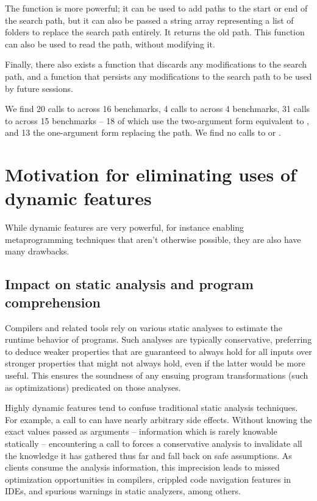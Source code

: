 The  function is more powerful; it can be used to add paths to the
start or end of the search path, but it can also be passed a string array
representing a list of folders to replace the search path entirely. It returns
the old path. This function can also be used to read the path, without
modifying it.

Finally, there also exists a  function that discards
any modifications to the search path, and a  function that
persists any modifications to the search path to be used by future \matlab
sessions.

We find 20 calls to  across 16 benchmarks, 4 calls to
 across 4 benchmarks, 31 calls to  across 15 benchmarks
-- 18 of which use the two-argument form equivalent to , and 13
the one-argument form replacing the path. We find no calls to
 or .

\section{Motivation for eliminating uses of dynamic features}

While dynamic features are very powerful, for instance enabling metaprogramming
techniques that aren't otherwise possible, they are also have many drawbacks.

\subsection{Impact on static analysis and program comprehension}

Compilers and related tools rely on various static analyses to estimate the
runtime behavior of programs. Such analyses are typically conservative,
preferring to deduce weaker properties that are guaranteed to always hold for
all inputs over stronger properties that might not always hold, even if the
latter would be more useful. This ensures the soundness of any ensuing program
transformations (such as optimizations) predicated on those analyses.

Highly dynamic features tend to confuse traditional static analysis techniques.
For example, a call to  can have nearly arbitrary side effects.
Without knowing the exact values passed as arguments -- information which is
rarely knowable statically -- encountering a call to  forces a
conservative analysis to invalidate all the knowledge it has gathered thus far
and fall back on safe assumptions. As clients consume the analysis information,
this imprecision leads to missed optimization opportunities in compilers,
crippled code navigation features in IDEs, and spurious warnings in static
analyzers, among others.

